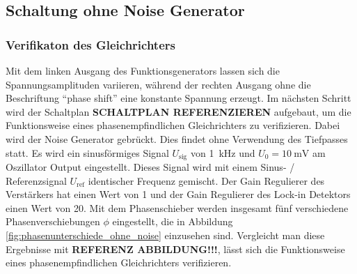 %
%
%
%
%
%
\subsection{Schaltung ohne Noise Generator}
\label{sec:ohne_noise}
\subsubsection{Verifikaton des Gleichrichters}
\label{sec:gleichrichter}
Mit dem linken Ausgang des Funktionsgenerators lassen sich die Spannungsamplituden variieren,
während der rechten Ausgang ohne die Beschriftung \enquote{phase shift} eine konstante Spannung erzeugt.
%
Im nächsten Schritt wird der Schaltplan \textbf{SCHALTPLAN REFERENZIEREN} aufgebaut,
um die Funktionsweise eines phasenempfindlichen Gleichrichters zu verifizieren.
Dabei wird der Noise Generator gebrückt.
Dies findet ohne Verwendung des Tiefpasses statt.
Es wird ein sinusförmiges Signal $U_\text{sig}$ von \qty[]{1}{\kilo\hertz} und $U_0 = \qty[]{10}{\milli\volt}$ am Oszillator Output eingestellt.
Dieses Signal wird mit einem Sinus- / Referenzsignal $U_\text{ref}$ identischer Frequenz gemischt.
Der Gain Regulierer des Verstärkers hat einen Wert von 1 und der Gain Regulierer des Lock-in Detektors einen Wert von 20.
Mit dem Phasenschieber werden insgesamt fünf verschiedene Phasenverschiebungen $\phi$ eingestellt,
die in Abbildung \ref{fig:phasenunterschiede_ohne_noise} einzusehen sind.
Vergleicht man diese Ergebnisse mit \textbf{REFERENZ ABBILDUNG!!!}, lässt sich
die Funktionsweise eines phasenempfindlichen Gleichrichters verifizieren.
%
